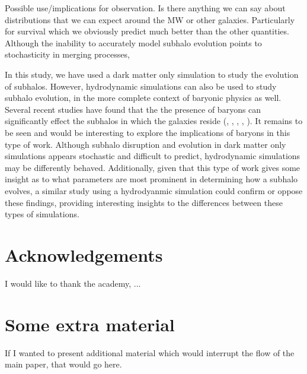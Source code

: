 \documentclass[fleqn,usenatbib]{mnras}
\newcommand\edits[1]{{\color{red}#1}}
\begin{document}
\edits{Possible use/implications for observation. Is there anything we can say about distributions that we can expect around the MW or other galaxies. Particularly for survival which we obviously predict much better than the other quantities.} Although the inability to accurately model subhalo evolution points to stochasticity in merging processes, 

In this study, we have used a dark matter only simulation to study the evolution of subhalos. However, hydrodynamic simulations can also be used to study subhalo evolution, in the more complete context of baryonic physics as well. Several recent studies have found that the the presence of baryons can significantly effect the subhalos in which the galaxies reside (\citet{Dolag2009}, \citet{Romano-Diaz2010}, \citet{Brooks2013}, \citet{Sawala2016}, \citet{Garrison-Kimmel2017}). It remains to be seen and would be interesting to explore the implications of baryons in this type of work. Although subhalo disruption and evolution in dark matter only simulations appears stochastic and difficult to predict, hydrodynamic simulations may be differently behaved. Additionally, given that this type of work gives some insight as to what parameters are most prominent in determining how a subhalo evolves, a similar study using a hydrodyanmic simulation could confirm or oppose these findings, providing interesting insights to the differences between these types of simulations. 

\section*{Acknowledgements}

I would like to thank the academy, ...









\appendix

\section{Some extra material}

If I wanted to present additional material which would interrupt the flow of the main paper, that would go here.



\bsp	%
\label{lastpage}
\end{document}
